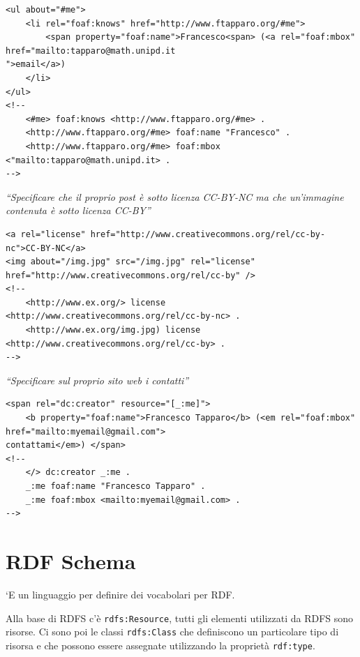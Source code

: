\begin{lstlisting}[language=RDFA]
<ul about="#me">
	<li rel="foaf:knows" href="http://www.ftapparo.org/#me">
		<span property="foaf:name">Francesco<span> (<a rel="foaf:mbox" href="mailto:tapparo@math.unipd.it
">email</a>)
	</li>
</ul>
<!-- 
	<#me> foaf:knows <http://www.ftapparo.org/#me> .
	<http://www.ftapparo.org/#me> foaf:name "Francesco" .
	<http://www.ftapparo.org/#me> foaf:mbox <"mailto:tapparo@math.unipd.it> .
-->
\end{lstlisting}

\begin{center}
	\textit{``Specificare che il proprio post è sotto licenza CC-BY-NC ma che un'immagine contenuta è sotto licenza CC-BY''}
\end{center}

\begin{lstlisting}[language=RDFA]
<a rel="license" href="http://www.creativecommons.org/rel/cc-by-nc">CC-BY-NC</a>
<img about="/img.jpg" src="/img.jpg" rel="license" href="http://www.creativecommons.org/rel/cc-by" />
<!-- 
	<http://www.ex.org/> license <http://www.creativecommons.org/rel/cc-by-nc> .
	<http://www.ex.org/img.jpg) license <http://www.creativecommons.org/rel/cc-by> .
-->
\end{lstlisting}

\begin{center}
	\textit{``Specificare sul proprio sito web i contatti''}
\end{center}

\begin{lstlisting}[language=RDFA]
<span rel="dc:creator" resource="[_:me]">
	<b property="foaf:name">Francesco Tapparo</b> (<em rel="foaf:mbox" href="mailto:myemail@gmail.com">
contattami</em>) </span>
<!-- 
	</> dc:creator _:me .
	_:me foaf:name "Francesco Tapparo" .
	_:me foaf:mbox <mailto:myemail@gmail.com> .
-->
\end{lstlisting}

\section{RDF Schema}

`E un linguaggio per definire dei vocabolari per RDF.

Alla base di RDFS c'è \texttt{rdfs:Resource}, tutti gli elementi utilizzati da RDFS sono risorse. Ci sono poi le classi \texttt{rdfs:Class} che definiscono un particolare tipo di risorsa e che possono essere assegnate utilizzando la proprietà \texttt{rdf:type}.


